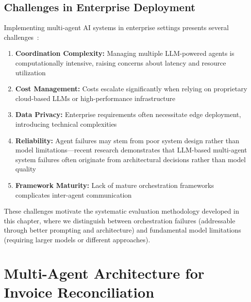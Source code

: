 \subsection{Challenges in Enterprise Deployment}

Implementing multi-agent AI systems in enterprise settings presents several challenges~\cite{chawla2024agentic}:

\begin{enumerate}[leftmargin=*]
    \item \textbf{Coordination Complexity:} Managing multiple LLM-powered agents is computationally intensive, raising concerns about latency and resource utilization
    
    \item \textbf{Cost Management:} Costs escalate significantly when relying on proprietary cloud-based LLMs or high-performance infrastructure
    
    \item \textbf{Data Privacy:} Enterprise requirements often necessitate edge deployment, introducing technical complexities
    
    \item \textbf{Reliability:} Agent failures may stem from poor system design rather than model limitations---recent research demonstrates that LLM-based multi-agent system failures often originate from architectural decisions rather than model quality
    
    \item \textbf{Framework Maturity:} Lack of mature orchestration frameworks complicates inter-agent communication
\end{enumerate}

These challenges motivate the systematic evaluation methodology developed in this chapter, where we distinguish between orchestration failures (addressable through better prompting and architecture) and fundamental model limitations (requiring larger models or different approaches).


\section{Multi-Agent Architecture for Invoice Reconciliation}
\label{sec:invoice_reconciliation}


